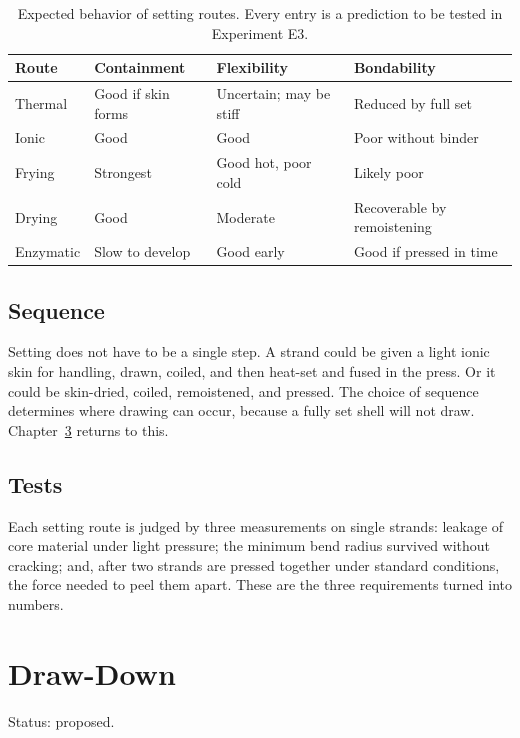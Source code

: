 \documentclass[11pt,openany]{book}
\theoremstyle{definition}
\begin{document}
\begin{table}[h]
\centering
\begin{tabularx}{\linewidth}{@{}lXXX@{}}
\toprule
Route & Containment & Flexibility & Bondability \\
\midrule
Thermal & Good if skin forms & Uncertain; may be stiff & Reduced by full set \\
Ionic & Good & Good & Poor without binder \\
Frying & Strongest & Good hot, poor cold & Likely poor \\
Drying & Good & Moderate & Recoverable by remoistening \\
Enzymatic & Slow to develop & Good early & Good if pressed in time \\
\bottomrule
\end{tabularx}
\caption{Expected behavior of setting routes. Every entry is a prediction to be tested in Experiment E3.}
\end{table}

\section{Sequence}

Setting does not have to be a single step. A strand could be given a light ionic skin for handling, drawn, coiled, and then heat-set and fused in the press. Or it could be skin-dried, coiled, remoistened, and pressed. The choice of sequence determines where drawing can occur, because a fully set shell will not draw. Chapter~\ref{ch:draw} returns to this.

\section{Tests}

Each setting route is judged by three measurements on single strands: leakage of core material under light pressure; the minimum bend radius survived without cracking; and, after two strands are pressed together under standard conditions, the force needed to peel them apart. These are the three requirements turned into numbers.

\chapter{Draw-Down}\label{ch:draw}

Status: proposed.
\end{document}
